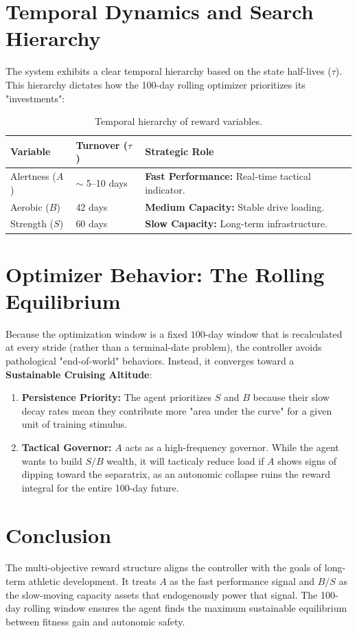 \documentclass[11pt,a4paper]{article}
\begin{document}
\section{Temporal Dynamics and Search Hierarchy}
The system exhibits a clear temporal hierarchy based on the state half-lives ($\tau$). This hierarchy dictates how the 100-day rolling optimizer prioritizes its "investments":

\begin{table}[h]
\centering
\begin{tabular}{lll}
\toprule
\textbf{Variable} & \textbf{Turnover ($\tau$)} & \textbf{Strategic Role} \\
\midrule
Alertness ($A$)   & $\sim$ 5--10 days & \textbf{Fast Performance:} Real-time tactical indicator. \\
Aerobic ($B$)     & 42 days          & \textbf{Medium Capacity:} Stable drive loading. \\
Strength ($S$)    & 60 days          & \textbf{Slow Capacity:} Long-term infrastructure. \\
\bottomrule
\end{tabular}
\caption{Temporal hierarchy of reward variables.}
\end{table}

\section{Optimizer Behavior: The Rolling Equilibrium}
Because the optimization window is a fixed $100$-day window that is recalculated at every stride (rather than a terminal-date problem), the controller avoids pathological "end-of-world" behaviors. Instead, it converges toward a \textbf{Sustainable Cruising Altitude}:
\begin{enumerate}
    \item \textbf{Persistence Priority:} The agent prioritizes $S$ and $B$ because their slow decay rates mean they contribute more "area under the curve" for a given unit of training stimulus.
    \item \textbf{Tactical Governor:} $A$ acts as a high-frequency governor. While the agent wants to build $S/B$ wealth, it will tacticaly reduce load if $A$ shows signs of dipping toward the separatrix, as an autonomic collapse ruins the reward integral for the entire 100-day future.
\end{enumerate}

\section{Conclusion}
The multi-objective reward structure aligns the controller with the goals of long-term athletic development. It treats $A$ as the fast performance signal and $B/S$ as the slow-moving capacity assets that endogenously power that signal. The 100-day rolling window ensures the agent finds the maximum sustainable equilibrium between fitness gain and autonomic safety.
\end{document}
